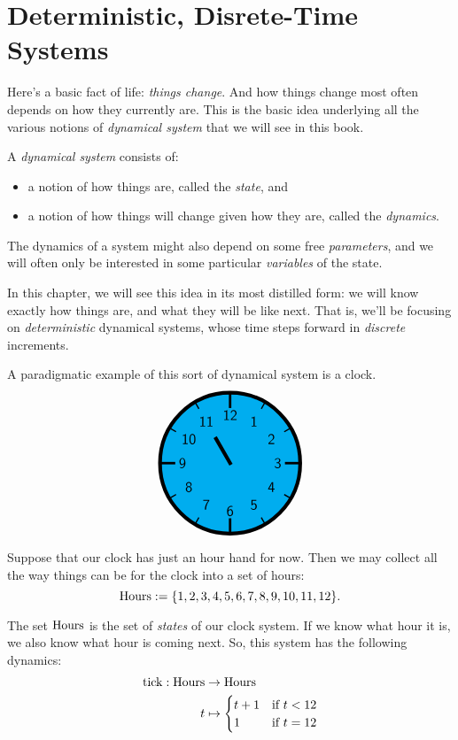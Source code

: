 \documentclass[DynamicalBook]{subfiles}
\begin{document}
%


\setcounter{chapter}{0}%


\chapter{Deterministic, Disrete-Time Systems}


Here's a basic fact of life: \emph{things change}. And how things change most
often depends on how they currently are. This is the basic idea underlying all the various notions of \emph{dynamical
  system} that we will see in this book.

\begin{informal}
  A \emph{dynamical system} consists of:
  \begin{itemize}
  \item a notion of how things are, called the \emph{state}, and
  \item a notion of how things will change given how they are, called the \emph{dynamics}.
  \end{itemize}
  The dynamics of a system might also depend on some free \emph{parameters}, and
  we will often only be interested in some particular \emph{variables} of the
  state. 
\end{informal}

In this chapter, we will see this idea in its
most distilled form: we will know exactly how things are, and what they will be
like next. That is, we'll be focusing on \emph{deterministic} dynamical systems,
whose time steps forward in \emph{discrete} increments.


A paradigmatic example of this sort of dynamical system is a clock.
\[
\begin{tikzpicture}[line cap=rect,line width=3pt]
\filldraw [fill=cyan] (0,0) circle [radius=2cm];
\foreach \angle [count=\xi] in {60,30,...,-270}
{
  \draw[line width=1pt] (\angle:1.8cm) -- (\angle:2cm);
  \node[font=\large] at (\angle:1.36cm) {\textsf{\xi}};
}
\foreach \angle in {0,90,180,270}
  \draw[line width=2pt] (\angle:1.6cm) -- (\angle:2cm);
\draw (0,0) -- (120:0.8cm);
\end{tikzpicture}
\]

Suppose that our clock has just an hour hand for now. Then we may collect all
the way things can be for the clock into a set of hours:
$$\mathrm{Hours} := \{1, 2, 3, 4, 5, 6, 7, 8, 9, 10, 11, 12\}.$$

The set $\mathrm{Hours}$ is the set of \emph{states} of our clock system. If we know what hour it is, we also know what hour is coming next. So, this system has the following dynamics:
%
%
\begin{align*}
  \mathrm{tick} : \mathrm{Hours} &\to \mathrm{Hours} \\
                t &\mapsto \begin{cases} t + 1 &\mbox{if $t < 12$}\\ 1 &\mbox{if $t = 12$}  \end{cases}
\end{align*}
\end{document}
